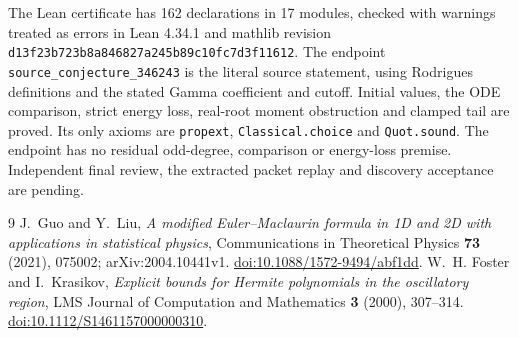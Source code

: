 \documentclass[11pt]{article}
\begin{document}
The Lean certificate has 162 declarations in 17 modules, checked with warnings treated as errors in Lean 4.34.1 and mathlib revision\newline
\texttt{d13f23b723b8a846827a245b89c10fc7d3f11612}. The endpoint \texttt{source\_conjecture\_346243} is the literal source statement, using Rodrigues definitions and the stated Gamma coefficient and cutoff. Initial values, the ODE comparison, strict energy loss, real-root moment obstruction and clamped tail are proved. Its only axioms are \texttt{propext}, \texttt{Classical.choice} and \texttt{Quot.sound}. The endpoint has no residual odd-degree, comparison or energy-loss premise. Independent final review, the extracted packet replay and discovery acceptance are pending.

\small
\begin{thebibliography}{9}
 J.~Guo and Y.~Liu, \emph{A modified Euler--Maclaurin formula in 1D and 2D with applications in statistical physics}, Communications in Theoretical Physics \textbf{73} (2021), 075002; arXiv:2004.10441v1. \href{https://doi.org/10.1088/1572-9494/abf1dd}{doi:10.1088/1572-9494/abf1dd}.
 W.~H. Foster and I.~Krasikov, \emph{Explicit bounds for Hermite polynomials in the oscillatory region}, LMS Journal of Computation and Mathematics \textbf{3} (2000), 307--314. \href{https://doi.org/10.1112/S1461157000000310}{doi:10.1112/S1461157000000310}.
\end{thebibliography}
\end{document}
